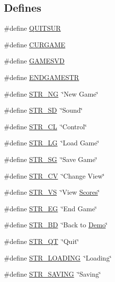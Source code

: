 \subsection*{Defines}
\begin{DoxyCompactItemize}
\item 
\#define \hyperlink{FOREIGN_8H_aed28a25bb4e6cca1d7b14888c9a0809b}{QUITSUR}
\item 
\#define \hyperlink{FOREIGN_8H_afd6cfc1f51b02a5585b6810e1eb09407}{CURGAME}
\item 
\#define \hyperlink{FOREIGN_8H_af6f0b49be1ef68d8f2643a9fb847c690}{GAMESVD}
\item 
\#define \hyperlink{FOREIGN_8H_a2cceb4212aaef45ded1ba97ed150d40c}{ENDGAMESTR}
\item 
\#define \hyperlink{FOREIGN_8H_ae8feade9fb6b352bf820da5cdcb63fa7}{STR\_\-NG}~\char`\"{}New Game\char`\"{}
\item 
\#define \hyperlink{FOREIGN_8H_a296de5ab2c43b957a2de8d5680f37fab}{STR\_\-SD}~\char`\"{}Sound\char`\"{}
\item 
\#define \hyperlink{FOREIGN_8H_ab290e2bc18995113971a1da6495e2c21}{STR\_\-CL}~\char`\"{}Control\char`\"{}
\item 
\#define \hyperlink{FOREIGN_8H_adaa32f309c8f2f981c2ff92d733f895e}{STR\_\-LG}~\char`\"{}Load Game\char`\"{}
\item 
\#define \hyperlink{FOREIGN_8H_ab77c7cf50374248e3e2dee0e6d9a3648}{STR\_\-SG}~\char`\"{}Save Game\char`\"{}
\item 
\#define \hyperlink{FOREIGN_8H_a4efda92833cafd132148a2c45e750858}{STR\_\-CV}~\char`\"{}Change View\char`\"{}
\item 
\#define \hyperlink{FOREIGN_8H_a82689904770d95d7939701c41277bfc6}{STR\_\-VS}~\char`\"{}View \hyperlink{ID__US__1_8C_a21091ead46c77ab22e506731e48c8d5e}{Scores}\char`\"{}
\item 
\#define \hyperlink{FOREIGN_8H_ab46c5a5d78a6d539eaf4b74b1db7c11c}{STR\_\-EG}~\char`\"{}End Game\char`\"{}
\item 
\#define \hyperlink{FOREIGN_8H_aaa5bbb109d85f4d7f3ceb174f52be963}{STR\_\-BD}~\char`\"{}Back to \hyperlink{ID__IN_8H_aee6aa8565f29397f3cdc22bf15ba6763}{Demo}\char`\"{}
\item 
\#define \hyperlink{FOREIGN_8H_ad23128b2b5dc8060ae1e0d9d4a8a3feb}{STR\_\-QT}~\char`\"{}Quit\char`\"{}
\item 
\#define \hyperlink{FOREIGN_8H_ad47027c8badadc57caada27cfc75c97c}{STR\_\-LOADING}~\char`\"{}Loading\char`\"{}
\item 
\#define \hyperlink{FOREIGN_8H_a2c26916b0d075ed97997649b5dc32090}{STR\_\-SAVING}~\char`\"{}Saving\char`\"{}

\end{DoxyCompactItemize}
